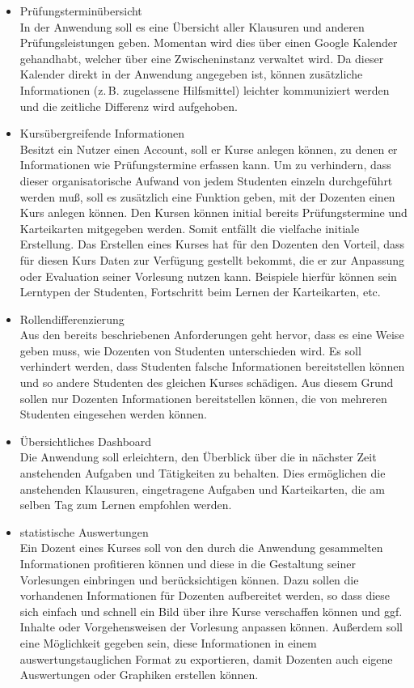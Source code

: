 \begin{itemize}
    \item Prüfungsterminübersicht           \\
        In der Anwendung soll es eine Übersicht aller Klausuren und anderen Prüfungsleistungen geben.
        Momentan wird dies über einen Google Kalender gehandhabt, welcher über eine Zwischeninstanz verwaltet wird.
        Da dieser Kalender direkt in der Anwendung angegeben ist, können zusätzliche Informationen (z.\,B. zugelassene Hilfsmittel) leichter kommuniziert werden und die zeitliche Differenz wird aufgehoben.

    \item Kursübergreifende Informationen   \\
        Besitzt ein Nutzer einen Account, soll er Kurse anlegen können, zu denen er Informationen wie  Prüfungstermine erfassen kann.
        Um zu verhindern, dass dieser organisatorische Aufwand von jedem Studenten einzeln durchgeführt werden muß, soll es zusätzlich eine Funktion geben, mit der Dozenten einen Kurs anlegen können.
        Den Kursen können initial bereits Prüfungstermine und Karteikarten mitgegeben werden.
        Somit entfällt die vielfache initiale Erstellung.
        Das Erstellen eines Kurses hat für den Dozenten den Vorteil, dass für diesen Kurs Daten zur Verfügung gestellt bekommt, die er zur Anpassung oder Evaluation seiner Vorlesung nutzen kann.
        Beispiele hierfür können sein Lerntypen der Studenten, Fortschritt beim Lernen der Karteikarten, etc.
    \item Rollendifferenzierung             \\
        Aus den bereits beschriebenen Anforderungen geht hervor, dass es eine Weise geben muss, wie Dozenten von Studenten unterschieden wird.
        Es soll verhindert werden, dass Studenten falsche Informationen bereitstellen können und so andere Studenten des gleichen Kurses schädigen.
        Aus diesem Grund sollen nur Dozenten Informationen bereitstellen können, die von mehreren Studenten eingesehen werden können.
    \item Übersichtliches Dashboard			\\
   		Die Anwendung soll erleichtern, den Überblick über die in nächster Zeit anstehenden Aufgaben und Tätigkeiten zu behalten. Dies ermöglichen die anstehenden Klausuren, eingetragene Aufgaben und Karteikarten, die am selben Tag zum Lernen empfohlen werden.
    \item statistische Auswertungen         \\
        Ein Dozent eines Kurses soll von den durch die Anwendung gesammelten Informationen profitieren können und diese in die Gestaltung seiner Vorlesungen einbringen und berücksichtigen können. Dazu sollen die vorhandenen Informationen für Dozenten aufbereitet werden, so dass diese sich einfach und schnell ein Bild über ihre Kurse verschaffen können und ggf. Inhalte oder Vorgehensweisen der Vorlesung anpassen können. Außerdem soll eine Möglichkeit gegeben sein, diese Informationen in einem auswertungstauglichen Format zu exportieren, damit Dozenten auch eigene Auswertungen oder Graphiken erstellen können.

\end{itemize}
